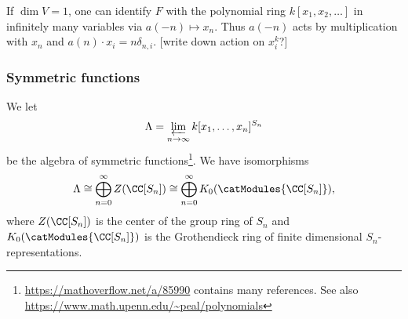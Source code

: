 \documentclass{ck-article}
\newcommand\SymGrp[1]{S_{#1}}
\begin{document}
\begin{Example}
    If $\dim V = 1$, one can identify $F$ with the polynomial ring $k[x_1,x_2,\dots]$ in infinitely many variables via $a(-n) \mapsto x_n$.
    Thus $a(-n)$ acts by multiplication with $x_n$ and $a(n) \cdot x_i = n\delta_{n,i}$. [write down action on $x_i^k$?]
\end{Example}

\subsubsection{Symmetric functions}

We let
\[
    \Lambda = \varprojlim_{n \to \infty} k[x_1,\dotsc,x_n]^{\SymGrp n}
\]
be the algebra of symmetric functions\footnote{\url{https://mathoverflow.net/a/85990} contains many references. See also \url{https://www.math.upenn.edu/~peal/polynomials}}.
We have isomorphisms
\[
    \Lambda \cong 
    \bigoplus_{n=0}^\infty Z(\CC[\SymGrp n]) \cong
    \bigoplus_{n=0}^\infty K_0(\catModules{\CC[\SymGrp n]}),
\]
where $Z(\CC[\SymGrp n])$ is the center of the group ring of $\SymGrp n$ and $K_0(\catModules{\CC[\SymGrp n]})$ is the Grothendieck ring of finite dimensional $\SymGrp n$-representations.
\end{document}
